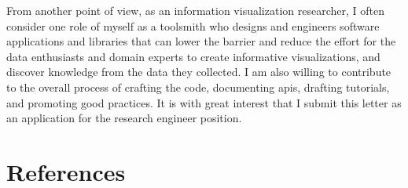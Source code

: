 \documentclass[11pt,a4paper,sans]{moderncv} %
\begin{document}
From another point of view, as an information visualization researcher, I often consider one role of myself as a toolsmith who designs and engineers software applications and libraries that can lower the barrier and reduce the effort for the data enthusiasts and domain experts to create informative visualizations, and discover knowledge from the data they collected. I am also willing to contribute to the overall process of crafting the code, documenting apis, drafting tutorials, and promoting good practices. It is with great interest that I submit this letter as an application for the research engineer position.




\section{References}
\end{document}
